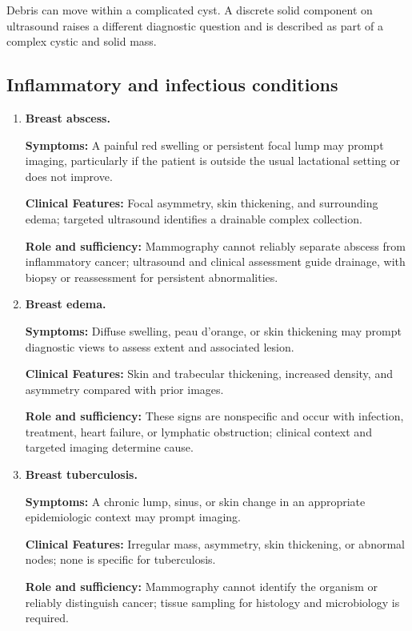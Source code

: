 Debris can move within a complicated cyst. A discrete solid component on ultrasound raises a different diagnostic question and is described as part of a complex cystic and solid mass.

\subsection{Inflammatory and infectious conditions}
\begin{enumerate}[leftmargin=*,itemsep=0.45em,topsep=0.4em]
\item \textbf{Breast abscess.}\par\noindent\textbf{Symptoms:} A painful red swelling or persistent focal lump may prompt imaging, particularly if the patient is outside the usual lactational setting or does not improve.\par\noindent\textbf{Clinical Features:} Focal asymmetry, skin thickening, and surrounding edema; targeted ultrasound identifies a drainable complex collection.\par\noindent\textbf{Role and sufficiency:} Mammography cannot reliably separate abscess from inflammatory cancer; ultrasound and clinical assessment guide drainage, with biopsy or reassessment for persistent abnormalities.
\item \textbf{Breast edema.}\par\noindent\textbf{Symptoms:} Diffuse swelling, peau d'orange, or skin thickening may prompt diagnostic views to assess extent and associated lesion.\par\noindent\textbf{Clinical Features:} Skin and trabecular thickening, increased density, and asymmetry compared with prior images.\par\noindent\textbf{Role and sufficiency:} These signs are nonspecific and occur with infection, treatment, heart failure, or lymphatic obstruction; clinical context and targeted imaging determine cause.
\item \textbf{Breast tuberculosis.}\par\noindent\textbf{Symptoms:} A chronic lump, sinus, or skin change in an appropriate epidemiologic context may prompt imaging.\par\noindent\textbf{Clinical Features:} Irregular mass, asymmetry, skin thickening, or abnormal nodes; none is specific for tuberculosis.\par\noindent\textbf{Role and sufficiency:} Mammography cannot identify the organism or reliably distinguish cancer; tissue sampling for histology and microbiology is required.

\end{enumerate}
